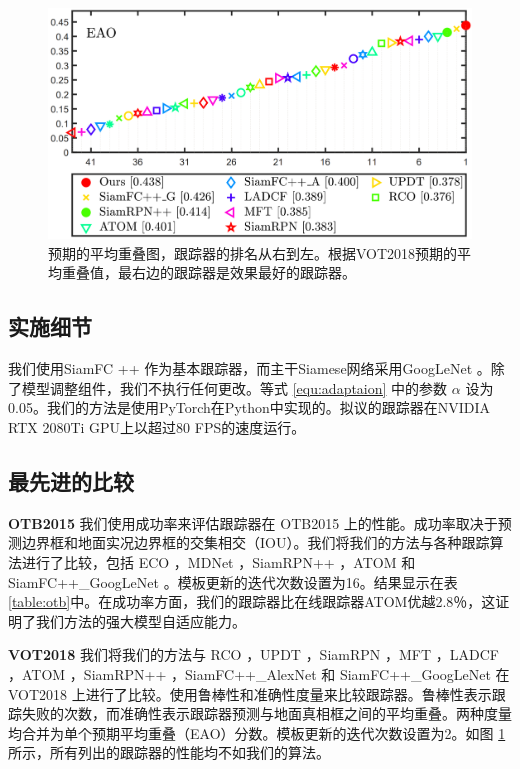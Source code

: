 \begin{figure}[t]
    \centering
    \includegraphics[width=1.0\textwidth]{Img/MTP/vot18/vot18_eao.png}
    \caption{预期的平均重叠图，跟踪器的排名从右到左。根据VOT2018预期的平均重叠值，最右边的跟踪器是效果最好的跟踪器。}
    \label{fig:eao}
\end{figure}

\subsection{实施细节}
我们使用SiamFC ++ \cite{SiamFC++}作为基本跟踪器，而主干Siamese网络采用GoogLeNet \cite{GoogLeNet}。除了模型调整组件，我们不执行任何更改。等式 \ref{equ:adaptaion} 中的参数 $\alpha$ 设为 0.05。我们的方法是使用PyTorch在Python中实现的。拟议的跟踪器在NVIDIA RTX 2080Ti GPU上以超过80 FPS的速度运行。

\subsection{最先进的比较}
\textbf{OTB2015} 我们使用成功率来评估跟踪器在 OTB2015 上的性能。成功率取决于预测边界框和地面实况边界框的交集相交（IOU）。我们将我们的方法与各种跟踪算法进行了比较，包括 ECO \cite{danelljan2017eco}，MDNet \cite{nam2016learning}，SiamRPN++ \cite{SiamRPN++}，ATOM \cite{danelljan2019atom} 和 SiamFC++\_GoogLeNet \cite{SiamFC++}。模板更新的迭代次数设置为16。结果显示在表 \ref{table:otb}中。在成功率方面，我们的跟踪器比在线跟踪器ATOM优越2.8％，这证明了我们方法的强大模型自适应能力。

\textbf{VOT2018} 我们将我们的方法与 RCO \cite{kristan2018sixth}，UPDT \cite{bhat2018unveiling}，SiamRPN \cite{SiamRPN}，MFT \cite{kristan2018sixth}，LADCF \cite{kristan2018sixth}，ATOM \cite{danelljan2019atom}，SiamRPN++ \cite{SiamRPN++}，SiamFC++\_AlexNet \cite{SiamFC++} 和 SiamFC++\_GoogLeNet \cite{SiamFC++} 在 VOT2018 上进行了比较。使用鲁棒性和准确性度量来比较跟踪器。鲁棒性表示跟踪失败的次数，而准确性表示跟踪器预测与地面真相框之间的平均重叠。两种度量均合并为单个预期平均重叠（EAO）分数。模板更新的迭代次数设置为2。如图 \ref{fig:eao} 所示，所有列出的跟踪器的性能均不如我们的算法。

